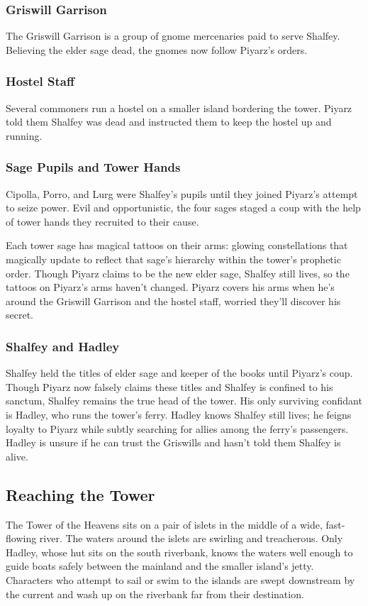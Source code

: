 \documentclass[10pt,a4paper,twoside,bg=print,twocolumn,openany,nodeprecatedcode]{dndbook}
\begin{document}
\subsubsection{Griswill Garrison}
The Griswill Garrison is a group of gnome mercenaries paid to serve Shalfey. Believing the elder sage dead, the gnomes now follow Piyarz's orders.

\subsubsection{Hostel Staff}
Several commoners run a hostel on a smaller island bordering the tower. Piyarz told them Shalfey was dead and instructed them to keep the hostel up and running.

\subsubsection{Sage Pupils and Tower Hands}
Cipolla, Porro, and Lurg were Shalfey's pupils until they joined Piyarz's attempt to seize power. Evil and opportunistic, the four sages staged a coup with the help of tower hands they recruited to their cause.

Each tower sage has magical tattoos on their arms: glowing constellations that magically update to reflect that sage's hierarchy within the tower's prophetic order. Though Piyarz claims to be the new elder sage, Shalfey still lives, so the tattoos on Piyarz's arms haven't changed. Piyarz covers his arms when he's around the Griswill Garrison and the hostel staff, worried they'll discover his secret.

\subsubsection{Shalfey and Hadley}
Shalfey held the titles of elder sage and keeper of the books until Piyarz's coup. Though Piyarz now falsely claims these titles and Shalfey is confined to his sanctum, Shalfey remains the true head of the tower. His only surviving confidant is Hadley, who runs the tower's ferry. Hadley knows Shalfey still lives; he feigns loyalty to Piyarz while subtly searching for allies among the ferry's passengers. Hadley is unsure if he can trust the Griswills and hasn't told them Shalfey is alive.

\subsection{Reaching the Tower}
The Tower of the Heavens sits on a pair of islets in the middle of a wide, fast-flowing river. The waters around the islets are swirling and treacherous. Only Hadley, whose hut sits on the south riverbank, knows the waters well enough to guide boats safely between the mainland and the smaller island's jetty. Characters who attempt to sail or swim to the islands are swept downstream by the current and wash up on the riverbank far from their destination.
\end{document}
